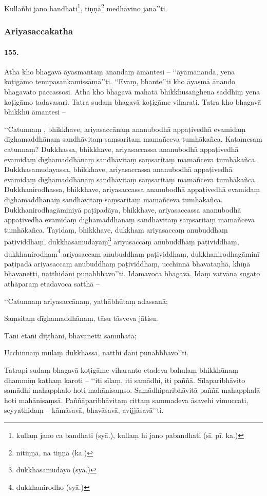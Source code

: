 Kullañhi jano bandhati\footnote{kullaṃ jano ca bandhati (syā.), kullaṃ hi jano pabandhati (sī. pī. ka.)}, tiṇṇā\footnote{nitiṇṇā, na tiṇṇā (ka.)} medhāvino janā’’ti.


\subsubsection{Ariyasaccakathā}

\paragraph{155.} Atha kho bhagavā āyasmantaṃ ānandaṃ āmantesi – ‘‘āyāmānanda, yena koṭigāmo tenupasaṅkamissāmā’’ti. ‘‘Evaṃ, bhante’’ti kho āyasmā ānando bhagavato paccassosi. Atha kho bhagavā mahatā bhikkhusaṅghena saddhiṃ yena koṭigāmo tadavasari. Tatra sudaṃ bhagavā koṭigāme viharati. Tatra kho bhagavā bhikkhū āmantesi –

‘‘Catunnaṃ , bhikkhave, ariyasaccānaṃ ananubodhā appaṭivedhā evamidaṃ dīghamaddhānaṃ sandhāvitaṃ saṃsaritaṃ mamañceva tumhākañca. Katamesaṃ catunnaṃ? Dukkhassa, bhikkhave, ariyasaccassa ananubodhā appaṭivedhā evamidaṃ dīghamaddhānaṃ sandhāvitaṃ saṃsaritaṃ mamañceva tumhākañca. Dukkhasamudayassa, bhikkhave, ariyasaccassa ananubodhā appaṭivedhā evamidaṃ dīghamaddhānaṃ sandhāvitaṃ saṃsaritaṃ mamañceva tumhākañca. Dukkhanirodhassa, bhikkhave, ariyasaccassa ananubodhā appaṭivedhā evamidaṃ dīghamaddhānaṃ sandhāvitaṃ saṃsaritaṃ mamañceva tumhākañca. Dukkhanirodhagāminiyā paṭipadāya, bhikkhave, ariyasaccassa ananubodhā appaṭivedhā evamidaṃ dīghamaddhānaṃ sandhāvitaṃ saṃsaritaṃ mamañceva tumhākañca. Tayidaṃ, bhikkhave, dukkhaṃ ariyasaccaṃ anubuddhaṃ paṭividdhaṃ, dukkhasamudayaṃ\footnote{dukkhasamudayo (syā.)} ariyasaccaṃ anubuddhaṃ paṭividdhaṃ, dukkhanirodhaṃ\footnote{dukkhanirodho (syā.)} ariyasaccaṃ anubuddhaṃ paṭividdhaṃ, dukkhanirodhagāminī paṭipadā ariyasaccaṃ anubuddhaṃ paṭividdhaṃ, ucchinnā bhavataṇhā, khīṇā bhavanetti, natthidāni punabbhavo’’ti. Idamavoca bhagavā. Idaṃ vatvāna sugato athāparaṃ etadavoca satthā –

‘‘Catunnaṃ ariyasaccānaṃ, yathābhūtaṃ adassanā;

Saṃsitaṃ dīghamaddhānaṃ, tāsu tāsveva jātisu.

Tāni etāni diṭṭhāni, bhavanetti samūhatā;

Ucchinnaṃ mūlaṃ dukkhassa, natthi dāni punabbhavo’’ti.

Tatrapi sudaṃ bhagavā koṭigāme viharanto etadeva bahulaṃ bhikkhūnaṃ dhammiṃ kathaṃ karoti – ‘‘iti sīlaṃ, iti samādhi, iti paññā. Sīlaparibhāvito samādhi mahapphalo hoti mahānisaṃso. Samādhiparibhāvitā paññā mahapphalā hoti mahānisaṃsā. Paññāparibhāvitaṃ cittaṃ sammadeva āsavehi vimuccati, seyyathidaṃ – kāmāsavā, bhavāsavā, avijjāsavā’’ti.

